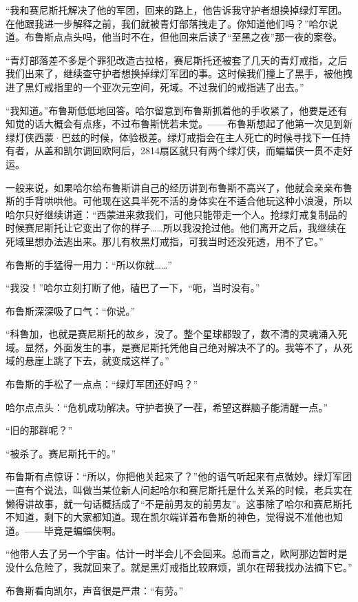 \documentclass[../main]{subfiles}
\begin{document}
“我和赛尼斯托解决了他的军团，回来的路上，他告诉我守护者想换掉绿灯军团。在他跟我进一步解释之前，我们就被青灯部落拽走了。你知道他们吗？”哈尔说道。布鲁斯点点头吗，他当时不在，但他回来后读了“至黑之夜”那一夜的案卷。

“青灯部落差不多是个罪犯改造古拉格，赛尼斯托还被套了几天的青灯戒指，之后我们出来了，继续查守护者想换掉绿灯军团的事。这时候我们撞上了黑手，被他拽进了黑灯戒指里的一个亚次元空间，死域。不过我们的戒指逃了出去。”

“我知道。”布鲁斯低低地回答。哈尔留意到布鲁斯抓着他的手收紧了，他要是还有知觉的话大概会有点疼，不过布鲁斯恍若未觉。——布鲁斯想起了他第一次见到新绿灯侠西蒙·巴兹的时候，体验极差。绿灯戒指会在主人死亡的时候寻找下一任持有者，从盖和凯尔调回欧阿后，2814扇区就只有两个绿灯侠，而蝙蝠侠一贯不走好运。

一般来说，如果哈尔给布鲁斯讲自己的经历讲到布鲁斯不高兴了，他就会亲亲布鲁斯的手背哄哄他。可他现在这具半死不活的身体实在不适合他玩这种小浪漫，所以哈尔只好继续讲道：“西蒙进来救我们，可他只能带走一个人。抢绿灯戒复制品的时候赛尼斯托让它变出了你的样子……所以我没抢过他。他们离开之后，我继续在死域里想办法逃出来。那儿有枚黑灯戒指，可我当时还没死透，用不了它。”

布鲁斯的手猛得一用力：“所以你就……”

“我没！”哈尔立刻打断了他，磕巴了一下，“呃，当时没有。”

布鲁斯深深吸了口气：“你说。”

“科鲁加，也就是赛尼斯托的故乡，没了。整个星球都毁了，数不清的灵魂涌入死域。显然，外面发生的事，是赛尼斯托凭他自己绝对解决不了的。我等不了，从死域的悬崖上跳了下去，就变成这样了。”

布鲁斯的手松了一点点：“绿灯军团还好吗？”

哈尔点点头：“危机成功解决。守护者换了一茬，希望这群脑子能清醒一点。”

“旧的那群呢？”

“被杀了。赛尼斯托干的。”

布鲁斯有点惊讶：“所以，你把他关起来了？”他的语气听起来有点微妙。绿灯军团一直有个说法，叫做当某位新人问起哈尔和赛尼斯托是什么关系的时候，老兵实在懒得讲故事，就一句话概括成了“不是前男友的前男友”。这事除了哈尔和赛尼斯托不知道，剩下的大家都知道。现在凯尔端详着布鲁斯的神色，觉得说不准他也知道。——毕竟是蝙蝠侠啊。

“他带人去了另一个宇宙。估计一时半会儿不会回来。总而言之，欧阿那边暂时是没什么危险了，我就回来了。就是黑灯戒指比较麻烦，凯尔在帮我找办法摘下它。”

布鲁斯看向凯尔，声音很是严肃：“有劳。”
\end{document}
